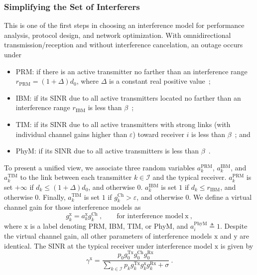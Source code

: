 \documentclass[12pt, draftclsnofoot, onecolumn]{IEEEtran}
\begin{document}
\subsubsection{Simplifying the Set of Interferers}
This is one of the first steps in choosing an interference model for performance analysis, protocol design, and network optimization. With omnidirectional transmission/reception and without interference cancelation, an outage occurs under
\begin{itemize}
  \item PRM: if there is an active transmitter no farther than an interference range $r_{\mathrm{PRM}} = (1+\Delta)d_{0}$, where $\Delta$ is a constant real positive value~\cite{gupta2000capacity};
  \item IBM: if its SINR due to all active transmitters located no farther than an interference range $r_{\mathrm{IBM}}$ is less than $\beta$~\cite{le2010longest};
  \item TIM: if its SINR due to all active transmitters with strong links (with individual channel gains higher than $\varepsilon$) toward receiver $i$ is less than $\beta$~\cite{jafar2014topological}; and
  \item PhyM: if its SINR due to all active transmitters is less than $\beta$~\cite{gupta2000capacity}.
\end{itemize}
To present a unified view, we associate three random variables $a_{k}^{\mathrm{PRM}}$, $a_{k}^{\mathrm{IBM}}$, and $a_{k}^{\mathrm{TIM}}$ to the link between each transmitter $k \in \mathcal{I}$ and the typical receiver. $a_{k}^{\mathrm{PRM}}$ is set ${+\infty}$ if $d_{k} \leq (1+\Delta)d_{0}$, and otherwise 0. $a_{k}^{\mathrm{IBM}}$ is set $1$ if $d_{k} \leq r_{\mathrm{IBM}}$, and otherwise 0. Finally, $a_{k}^{\mathrm{TIM}}$ is set $1$ if $g_{k}^{\mathrm{Ch}} > \varepsilon $, and otherwise 0. We define a virtual channel gain for those interference models as
\begin{equation}\label{eq: general-model}
g_{k}^{\mathrm{x}} = a_{k}^{\mathrm{x}} g_{k}^{\mathrm{Ch}}\:, \qquad  \mbox{for interference model}~\mathrm{x} \:,
\end{equation}
where $\mathrm{x}$ is a label denoting PRM, IBM, TIM, or PhyM, and $a_{i}^{\mathrm{PhyM}} \triangleq 1$. Despite the virtual channel gain, all other parameters of interference models $\mathrm{x}$ and $\mathrm{y}$ are identical. The SINR at the typical receiver under interference model $\mathrm{x}$ is given by
\begin{equation}\label{eq: protocol-model}
\gamma^{\mathrm{x}} = \frac{p_0 g_{0}^{\mathrm{Tx}} g_{0}^{\mathrm{Ch}} g_{0}^{\mathrm{Rx}}}{\sum\limits_{k \in \mathcal{I}} p_k g_{k}^{\mathrm{Tx}} g_{k}^{\mathrm{x}} g_{k}^{\mathrm{Rx}} + \sigma}  \:.
\end{equation}
\end{document}
